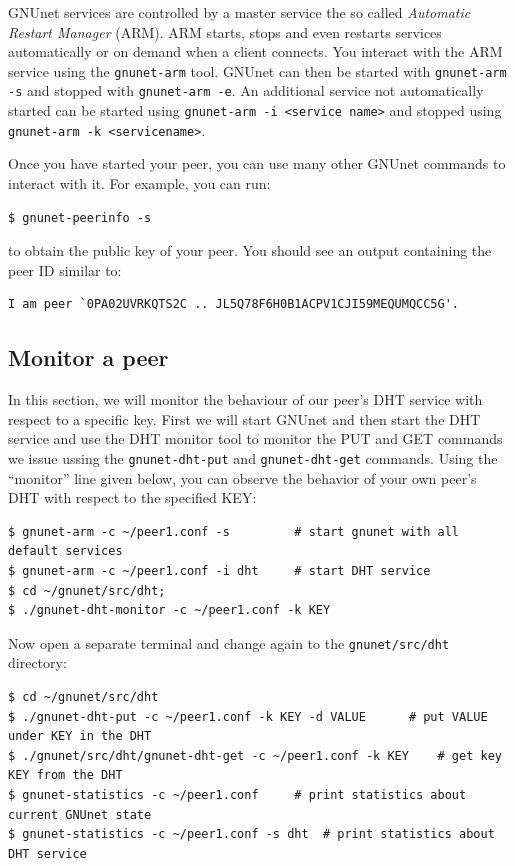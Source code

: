 \documentclass[10pt]{article}
\begin{document}
GNUnet services are controlled by a master service the so called \textit{Automatic Restart Manager} (ARM).
ARM starts, stops and even restarts services automatically or on demand when a client connects.
You interact with the ARM service using the \lstinline|gnunet-arm| tool.
GNUnet can then be started with \lstinline|gnunet-arm -s| and stopped with
\lstinline|gnunet-arm -e|.  An additional service not automatically started
can be started using \lstinline|gnunet-arm -i <service name>| and stopped
using \lstinline|gnunet-arm -k <servicename>|.

Once you have started your peer, you can use many other GNUnet commands
to interact with it.  For example, you can run:
\lstset{language=bash}
\begin{lstlisting}
$ gnunet-peerinfo -s
\end{lstlisting}
to obtain the public key of your peer.
You should see an output containing the peer ID similar to:
\lstset{language=bash}
\begin{lstlisting}
I am peer `0PA02UVRKQTS2C .. JL5Q78F6H0B1ACPV1CJI59MEQUMQCC5G'.
\end{lstlisting}


\subsection{Monitor a peer}

In this section, we will monitor the behaviour of our peer's DHT service with respect to a
specific key. First we will start GNUnet and then start the DHT service and use the DHT monitor tool
to monitor the PUT and GET commands we issue ussing the \lstinline|gnunet-dht-put| and
\lstinline|gnunet-dht-get| commands. Using the ``monitor'' line given below, you can observe the behavior of
your own peer's DHT with respect to the specified KEY:

\lstset{language=bash}
\begin{lstlisting}
$ gnunet-arm -c ~/peer1.conf -s			# start gnunet with all default services
$ gnunet-arm -c ~/peer1.conf -i dht		# start DHT service
$ cd ~/gnunet/src/dht;
$ ./gnunet-dht-monitor -c ~/peer1.conf -k KEY
\end{lstlisting}
Now open a separate terminal and change again to the \lstinline|gnunet/src/dht| directory:
\lstset{language=bash}
\begin{lstlisting}
$ cd ~/gnunet/src/dht
$ ./gnunet-dht-put -c ~/peer1.conf -k KEY -d VALUE		# put VALUE under KEY in the DHT
$ ./gnunet/src/dht/gnunet-dht-get -c ~/peer1.conf -k KEY	# get key KEY from the DHT
$ gnunet-statistics -c ~/peer1.conf		# print statistics about current GNUnet state
$ gnunet-statistics -c ~/peer1.conf -s dht	# print statistics about DHT service
\end{lstlisting}
\end{document}

